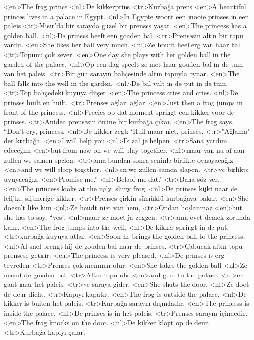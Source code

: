 <en>The frog prince
<nl>De kikkerprins
<tr>Kurbağa prens
<en>A beautiful princes lives in a palace in Egypt.
<nl>In Egypte woont een mooie prinses in een paleis 
<tr>Mısır'da bir sarayda güzel bir prenses yaşar.
<en>The princess has a golden ball.
<nl>De prinses heeft een gouden bal.
<tr>Prensesin altın bir topu vardır.
<en>She likes her ball very much.
<nl>Ze houdt heel erg van haar bal.
<tr>Topunu çok sever.
<en>One day she plays with her golden ball in the garden of the palace.
<nl>Op een dag speelt ze met haar gouden bal in de tuin van het paleis.
<tr>Bir gün sarayın bahçesinde altın topuyla oynar.
<en>The ball falls into the well in the garden.
<nl>De bal valt in de put in de tuin.
<tr>Top bahçedeki kuyuya düşer.
<en>The princess cries and cries.
<nl>De prinses huilt en huilt.
<tr>Prenses ağlar, ağlar.
<en>Just then a frog jumps in front of the princess.
<nl>Precies op dat moment springt een kikker voor de prinses.
<tr>Aniden prensesin önüne bir kurbağa çıkar.
<en>The frog says, “Don’t cry, princess.
<nl>De kikker zegt: `Huil maar niet, prinses.
<tr>"Ağlama" der kurbağa.
<en>I will help you
<nl>Ik zal je helpen.
<tr>Sana yardım edeceğim
<en>but from now on we will play together, 
<nl>maar van nu af aan zullen we samen spelen. 
<tr>ama bundan sonra seninle birlikte oynayacağız
<en>and we will sleep together.
<nl>en we zullen samen slapen.
<tr>ve birlikte uyuyacağız.
<en>Promise me.”
<nl>Beloof me dat.'
<tr>Bana söz ver.
<en>The princess looks at the ugly, slimy frog.
<nl>De prinses kijkt naar de lelijke, slijmerige kikker.
<tr>Prenses çirkin sümüklü kurbağaya bakar.
<en>She doesn’t like him
<nl>Ze houdt niet van hem,
<tr>Ondan hoşlanmaz
<en>but she has to say, “yes”.
<nl>maar ze moet ja zeggen.
<tr>ama evet demek zorunda kalır.
<en>The frog jumps into the well.
<nl>De kikker springt in de put.
<tr>kurbağa kuyuya atlar.
<en>Soon he brings the golden ball to the princess.
<nl>Al snel brengt hij de gouden bal naar de prinses.
<tr>Çabucak altın topu prensese getirir.
<en>The princess is very pleased.
<nl>De prinses is erg tevreden
<tr>Prenses çok memnun olur.
<en>She takes the golden ball
<nl>Ze neemt de gouden bal,
<tr>Altın topu alır
<en>and goes to the palace.
<nl>en gaat naar het paleis.
<tr>ve saraya gider.
<en>She shuts the door.
<nl>Ze doet de deur dicht.
<tr>Kapıyı kapatır.
<en>The frog is outside the palace.
<nl>De kikker is buiten het paleis.
<tr>Kurbağa sarayın dışındadır.
<en>The princess is inside the palace.
<nl>De prinses is in het paleis.
<tr>Prenses sarayın içindedir.
<en>The frog knocks on the door.
<nl>De kikker klopt op de deur.
<tr>Kurbağa kapıyı çalar.
